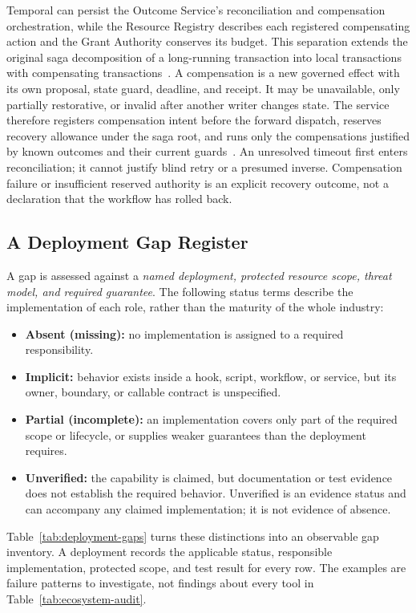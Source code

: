 Temporal can persist the Outcome Service's reconciliation and compensation orchestration, while the Resource Registry describes each registered compensating action and the Grant Authority conserves its budget. This separation extends the original saga decomposition of a long-running transaction into local transactions with compensating transactions~\cite{sagas1987}. A compensation is a new governed effect with its own proposal, state guard, deadline, and receipt. It may be unavailable, only partially restorative, or invalid after another writer changes state. The service therefore registers compensation intent before the forward dispatch, reserves recovery allowance under the saga root, and runs only the compensations justified by known outcomes and their current guards~\cite{temporalsaga2023}. An unresolved timeout first enters reconciliation; it cannot justify blind retry or a presumed inverse. Compensation failure or insufficient reserved authority is an explicit recovery outcome, not a declaration that the workflow has rolled back.

\subsection{A Deployment Gap Register}
\label{sec:missing-pieces}

A gap is assessed against a \emph{named deployment, protected resource scope, threat model, and required guarantee}. The following status terms describe the implementation of each role, rather than the maturity of the whole industry:
\begin{itemize}
\item \textbf{Absent (missing):} no implementation is assigned to a required responsibility.
\item \textbf{Implicit:} behavior exists inside a hook, script, workflow, or service, but its owner, boundary, or callable contract is unspecified.
\item \textbf{Partial (incomplete):} an implementation covers only part of the required scope or lifecycle, or supplies weaker guarantees than the deployment requires.
\item \textbf{Unverified:} the capability is claimed, but documentation or test evidence does not establish the required behavior. Unverified is an evidence status and can accompany any claimed implementation; it is not evidence of absence.
\end{itemize}

Table~\ref{tab:deployment-gaps} turns these distinctions into an observable gap inventory. A deployment records the applicable status, responsible implementation, protected scope, and test result for every row. The examples are failure patterns to investigate, not findings about every tool in Table~\ref{tab:ecosystem-audit}.

